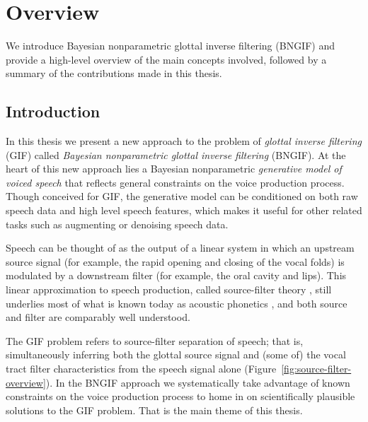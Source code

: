 \chapter{Overview\label{chapter:1}}

\begin{chaptersections}{%
We introduce Bayesian nonparametric glottal inverse filtering (BNGIF) and provide a high-level overview of the main concepts involved, followed by a summary of the contributions made in this thesis.
}

\section{Introduction\label{sec:introduction}}

In this thesis we present a new approach to the problem of \emph{glottal inverse filtering} (GIF) called \emph{Bayesian nonparametric glottal inverse filtering} (BNGIF).
At the heart of this new approach lies a Bayesian nonparametric \emph{generative model of voiced speech} that reflects general constraints on the voice production process.
Though conceived for GIF, the generative model can be conditioned on both raw speech data and high level speech features, which makes it useful for other related tasks such as augmenting or denoising speech data.

Speech can be thought of as the output of a linear system in which an upstream source signal (for example, the rapid opening and closing of the vocal folds) is modulated by a downstream filter (for example, the oral cavity and lips).
This linear approximation to speech production, called source-filter theory \citep{Fant1960}, still underlies most of what is known today as acoustic phonetics \citep{Maurer2016}, and both source and filter are comparably well understood.

The GIF problem refers to source-filter separation of speech; that is, simultaneously inferring both the glottal source signal and (some of) the vocal tract filter characteristics from the speech signal alone (Figure~\ref{fig:source-filter-overview}).
In the BNGIF approach we systematically take advantage of known constraints on the voice production process to home in on scientifically plausible solutions to the GIF problem.
That is the main theme of this thesis.


\end{chaptersections}
